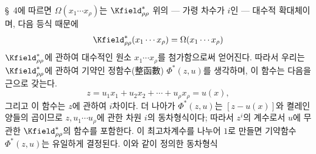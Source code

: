 
\S\ 4에 따르면 $\Omega(x_1\cdots x_\rho)$는 $\Kfield^*_{\rho\rho}$ 위의 --- 가령 차수가 $i$인 --- 대수적 확대체이며, 다음 등식 때문에
\[
\Kfield^*_{\rho\rho}(x_1\cdots x_\rho)=\Omega(x_1\cdots x_\rho)
\]
$\Kfield^*_{\rho\rho}$에 관하여 대수적인 원소 $x_1\cdots x_\rho$를 첨가함으로써 얻어진다. 따라서 우리는 $\Kfield^*_{\rho\rho}$에 관하여 기약인 정함수(整函數) $\Phi^*(z,u)$를 생각하며, 이 함수는 다음을 근으로 갖는다.
\[
z=u_1x_1+u_2x_2+\cdots+u_\rho x_\rho=u(x),
\]
그리고 이 함수는 $z$에 관하여 $i$차이다. 더 나아가 $\Phi^*(z,u)$는 $[z-u(x)]$와 켤레인 양들의 곱이므로 $z,u_1\cdots u_\rho$에 관한 차원 $i$의 동차형식이다; 따라서 $z^i$의 계수로서 $u$에 무관한 $\Kfield^*_{\rho\rho}$의 함수를 포함한다. 이 최고차계수를 나누어 $1$로 만들면 기약함수 $\Phi^*(z,u)$는 유일하게 결정된다. 이와 같이 정의한 동차형식
